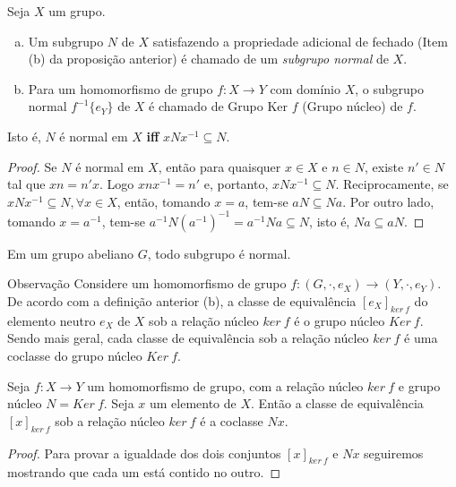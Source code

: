 \begin{definition}[Magma]
\begin{definition}
            Seja $X$ um grupo.
            \begin{enumerate}[(a)]
               \item Um subgrupo $N$ de $X$ satisfazendo a propriedade adicional de fechado (Item (b) da proposição anterior) é chamado de um \emph{subgrupo normal} de $X$.
               \item Para um homomorfismo de grupo $f: X\to Y$ com domínio $X$, o subgrupo normal $f^{-1}\{e_{Y}\}$ de $X$ é chamado de Grupo Ker $f$ (Grupo núcleo) de $f$.
            \end{enumerate}
            Isto é, $N$ é normal em $X$ \textbf{iff} $xNx^{-1} \subseteq N$. 
            \begin{proof}
               Se $N$ é normal em $X$, então para quaisquer $x \in X$ e $n \in N$, existe $n' \in N$ tal que $xn = n'x$. Logo $xnx^{-1} = n'$ e, portanto, $xNx^{-1} \subseteq N$.
               Reciprocamente, se $xNx^{-1} \subseteq N, \forall x \in X$, então, tomando $x = a$, tem-se $aN \subseteq Na$. Por outro lado, tomando $x = a^{-1}$, tem-se $a^{-1}N(a^{-1})^{-1} = a^{-1}Na \subseteq N$, isto é, $Na \subseteq aN$.
            \end{proof}
         \end{definition}
         \begin{stat}
            Em um grupo abeliano $G$, todo subgrupo é normal.
         \end{stat}
         \begin{mymdframed}{Observação}
            Considere um homomorfismo de grupo $f: (G,\cdot,e_{X}) \to (Y,\cdot,e_{Y})$. De acordo com a definição anterior (b), a classe de equivalência $[e_{X}]_{ker\ f}$ do elemento neutro $e_{X}$ de $X$ sob a relação núcleo $ker\ f$ é o grupo núcleo $Ker\ f$. Sendo mais geral, cada classe de equivalência sob a relação núcleo $ker\ f$ é uma coclasse do grupo núcleo $Ker\ f$.
         \end{mymdframed}
         \begin{stat}
            Seja $f: X\to Y$ um homomorfismo de grupo, com a relação núcleo $ker\ f$ e grupo núcleo $N=Ker\ f$. Seja $x$ um elemento de $X$. Então a classe de equivalência $[x]_{ker\ f}$ sob a relação núcleo $ker\ f$ é a coclasse $Nx$.
            \begin{proof}
               Para provar a igualdade dos dois conjuntos $[x]_{ker\ f}$ e $Nx$ seguiremos mostrando que cada um está contido no outro.


\end{proof}
\end{stat}
\end{definition}
